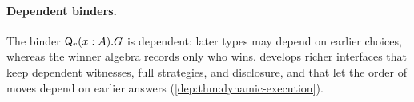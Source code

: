 \paragraph{Dependent binders.}
The binder $\mathsf Q_r(x:A).G$ is dependent: later types may depend on earlier choices, whereas the winner algebra records only who wins.  develops richer interfaces that keep dependent witnesses, full strategies, and disclosure, and that let the order of moves depend on earlier answers (\cref{dep:thm:dynamic-execution}).
